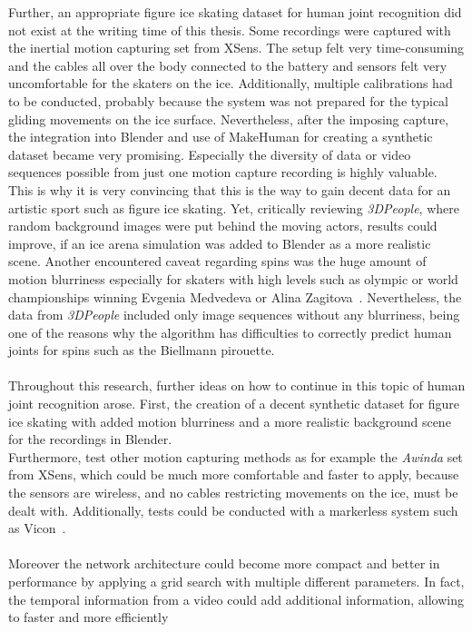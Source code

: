 Further, an appropriate figure ice skating dataset for human joint recognition did not exist at the writing time of this thesis.
Some recordings were captured with the inertial motion capturing set from XSens.
The setup felt very time-consuming and the cables all over the body connected to the battery and sensors felt very uncomfortable
for the skaters on the ice.
Additionally, multiple calibrations had to be conducted, probably because the system was not prepared
for the typical gliding movements on the ice surface.
Nevertheless, after the imposing capture, the integration into Blender and use of MakeHuman for creating a synthetic dataset
became very promising.
Especially the diversity of data or video sequences possible from just one motion capture recording is highly valuable.
This is why it is very convincing that this is the way to gain decent data for an artistic sport such as figure
ice skating.
Yet, critically reviewing \textit{3DPeople}, where random background images were put behind the moving actors,
results could improve, if an ice arena simulation was added to Blender as a more realistic scene.
Another encountered caveat regarding spins was the huge amount of motion blurriness especially for skaters with high levels such as olympic or world championships winning
Evgenia Medvedeva or Alina Zagitova~\cite{2018world}.
Nevertheless, the data from \textit{3DPeople} included only image sequences without any blurriness, being one of the reasons why
the algorithm has difficulties to correctly predict human joints for spins such as the Biellmann pirouette.
\\\mbox{}\\
Throughout this research, further ideas on how to continue in this topic of human joint recognition arose.
First, the creation of a decent synthetic dataset for figure ice skating with added motion blurriness and a more realistic
background scene for the recordings in Blender.\\
Furthermore, test other motion capturing methods as for example the \textit{Awinda} set from XSens, which could be much more comfortable
and faster to apply, because the sensors are wireless, and no cables restricting movements on the ice, must be dealt with.
Additionally, tests could be conducted with a markerless system such as Vicon~\cite{mocapoptical}.
\\\mbox{}\\
Moreover the network architecture could become more compact and better in performance by applying a grid search with multiple different
parameters.
In fact, the temporal information from a video could add additional information, allowing to faster and more efficiently
